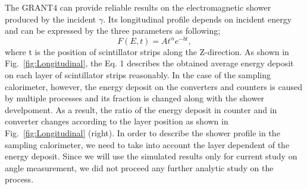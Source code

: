 \documentclass[jkps,preprint,fleqn,showpacs,showkeys]{revtex4}
\begin{document}
The GRANT4 can provide reliable results on the electromagnetic shower produced by the incident $\gamma$. 
Its longitudinal profile depends on incident energy and can be expressed \cite{Longo} by the three parameters as following;
\begin{equation}
    F(E,t)=A  t^\alpha e^{-bt},
\end{equation}
where t is the position of scintillator strips along the Z-direction. As shown in Fig.~\ref{fig:Longitudinal}, the Eq. 1 describes the obtained average energy deposit on each layer of scintillator strips reasonably. In the case of the sampling calorimeter, however, the energy deposit on the converters and counters is caused by multiple processes and its fraction is changed along with the shower develpoment.
As a result, the ratio of the energy deposit in counter and in converter changes according to the layer position as shown in Fig.~\ref{fig:Longitudinal} (right).%
In order to describe the shower profile in the sampling calorimeter, we need to take into account the layer dependent of the energy deposit. Since we will use the simulated results only for current study on angle measurement, we did not proceed any further analytic study on the process.
\end{document}
